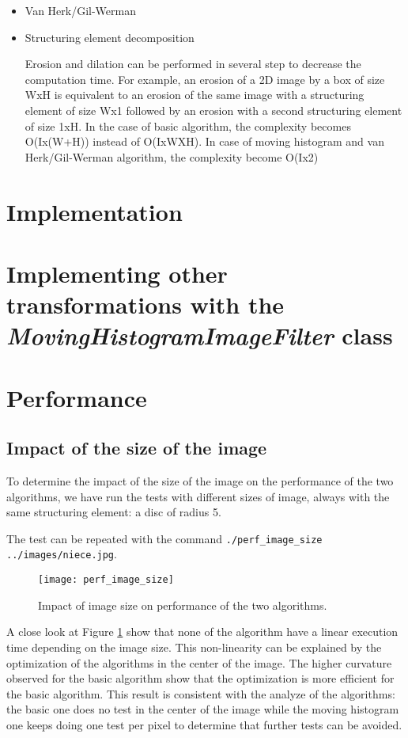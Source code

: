 \documentclass{InsightArticle}
\begin{document}
\begin{itemize}
  \item Van Herk/Gil-Werman

  \item Structuring element decomposition

Erosion and dilation can be performed in several step to decrease the computation time.
For example, an erosion of a 2D image by a box of size WxH is equivalent to an erosion
of the same image with a structuring element of size Wx1 followed by an erosion with
a second structuring element of size 1xH. In the case of basic algorithm, the complexity
becomes O(Ix(W+H)) instead of O(IxWXH). In case of moving histogram and van Herk/Gil-Werman
algorithm, the complexity become O(Ix2)

\end{itemize}

\section{Implementation}

\section{Implementing other transformations with the {\em MovingHistogramImageFilter} class}

\section{Performance}

  \subsection{Impact of the size of the image}

To determine the impact of the size of the image on the performance of the two
algorithms, we have run the tests with different sizes of image, always with
the same structuring element: a disc of radius 5.

The test can be repeated with the command
\verb$./perf_image_size ../images/niece.jpg$.

\begin{figure}[htbp]
\centering
\texttt{[image: perf\_image\_size]}
\caption{Impact of image size on performance of the two algorithms.\label{perf_image_size}}
\end{figure}

A close look at Figure \ref{perf_image_size} show that none of the algorithm
have a linear execution time depending on the image size. This non-linearity can
be explained by the optimization of the algorithms in the center of the
image. The higher curvature observed for the basic algorithm show that the
optimization is more efficient for the basic algorithm. This result is
consistent with the analyze of the algorithms: the basic one does no test in the
center of the image while the moving histogram one keeps doing one test per
pixel to determine that further tests can be avoided.
\end{document}
